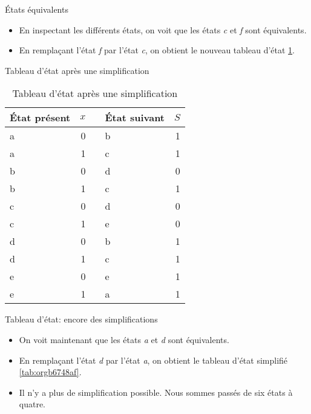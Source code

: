 \documentclass[presentation]{beamer}
\begin{document}
\begin{frame}[label={sec:org0d70f34}]{États équivalents}
\begin{itemize}
\item En inspectant les différents états, on voit que les états \emph{c} et \emph{f} sont équivalents.

\item En remplaçant l'état \emph{f} par l'état \emph{c}, on obtient le nouveau tableau d'état \ref{tab:org84d4661}.
\end{itemize}
\end{frame}

\begin{frame}[label={sec:org55dcb9f}]{Tableau d'état après une simplification}
\begin{table}[htbp]
\caption{\label{tab:org84d4661}Tableau d'état après une simplification}
\centering
\begin{tabular}{lrllr}
État présent & \(x\) &  & État suivant & \(S\)\\[0pt]
\hline
a & 0 &  & b & 1\\[0pt]
a & 1 &  & c & 1\\[0pt]
b & 0 &  & d & 0\\[0pt]
b & 1 &  & c & 1\\[0pt]
c & 0 &  & d & 0\\[0pt]
c & 1 &  & e & 0\\[0pt]
d & 0 &  & b & 1\\[0pt]
d & 1 &  & c & 1\\[0pt]
e & 0 &  & e & 1\\[0pt]
e & 1 &  & a & 1\\[0pt]
\end{tabular}
\end{table}
\end{frame}

\begin{frame}[label={sec:org534d87a}]{Tableau d'état: encore des simplifications}
\begin{itemize}
\item On voit maintenant que les états \emph{a} et \emph{d} sont équivalents.

\item En remplaçant l'état \emph{d} par l'état \emph{a}, on obtient le tableau d'état simplifié \ref{tab:orgb6748af}.

\item Il n'y a plus de simplification possible. Nous sommes passés de six états à quatre.
\end{itemize}
\end{frame}
\end{document}
